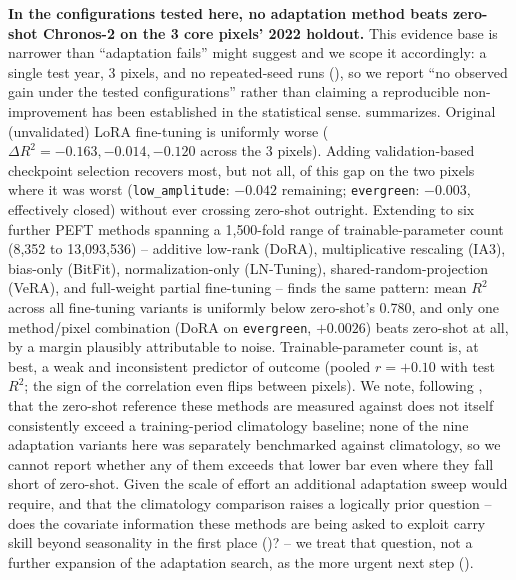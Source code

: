 \documentclass[11pt]{article}
\begin{document}
\textbf{In the configurations tested here, no adaptation method beats zero-shot Chronos-2 on the 3
core pixels' 2022 holdout.} This evidence base is narrower than ``adaptation fails'' might suggest
and we scope it accordingly: a single test year, 3 pixels, and no repeated-seed runs
(), so we report ``no observed gain under the tested configurations'' rather
than claiming a reproducible non-improvement has been established in the statistical sense.
 summarizes. Original (unvalidated) LoRA fine-tuning is uniformly worse
($\Delta R^2 = -0.163, -0.014, -0.120$ across the 3 pixels). Adding validation-based checkpoint
selection recovers most, but not all, of this gap on the two pixels where it was worst
(\texttt{low\_amplitude}: $-0.042$ remaining; \texttt{evergreen}: $-0.003$, effectively closed)
without ever crossing zero-shot outright. Extending to six further PEFT methods spanning a
1{,}500-fold range of trainable-parameter count (8{,}352 to 13{,}093{,}536) -- additive low-rank
(DoRA), multiplicative rescaling (IA3), bias-only (BitFit), normalization-only (LN-Tuning),
shared-random-projection (VeRA), and full-weight partial fine-tuning -- finds the same pattern:
mean $R^2$ across all fine-tuning variants is uniformly below zero-shot's 0.780, and only one
method/pixel combination (DoRA on \texttt{evergreen}, $+0.0026$) beats zero-shot at all, by a
margin plausibly attributable to noise. Trainable-parameter count is, at best, a weak and
inconsistent predictor of outcome (pooled $r = +0.10$ with test $R^2$; the sign of the correlation
even flips between pixels). We note, following , that the zero-shot
reference these methods are measured against does not itself consistently exceed a training-period
climatology baseline; none of the nine adaptation variants here was separately benchmarked against
climatology, so we cannot report whether any of them exceeds that lower bar even where they fall
short of zero-shot. Given the scale of effort an additional adaptation sweep would require, and
that the climatology comparison raises a logically prior question -- does the covariate
information these methods are being asked to exploit carry skill beyond seasonality in the first
place ()? -- we treat that question, not a further expansion of the
adaptation search, as the more urgent next step ().
\end{document}

